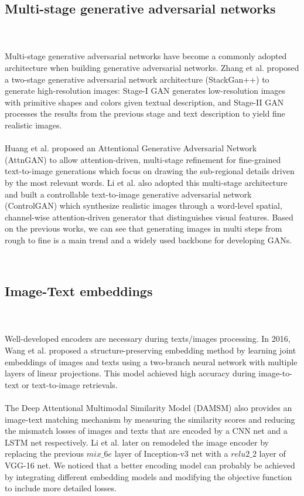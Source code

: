 \documentclass[10pt,twocolumn,letterpaper]{article}
\begin{document}
\subsection{Multi-stage generative adversarial networks}
\\\\
\noindent Multi-stage generative adversarial networks have become a commonly adopted architecture when building generative adversarial networks. Zhang et al. proposed a two-stage generative adversarial network architecture (StackGan++)  \cite{zhang2018stackgan++} to generate high-resolution images: Stage-I GAN generates low-resolution images with primitive shapes and colors given textual description, and Stage-II GAN processes the results from the previous stage and text description to yield fine realistic images.
\\\\
Huang et al. \cite{xu2018attngan} proposed an Attentional Generative Adversarial Network (AttnGAN) to allow attention-driven, multi-stage refinement for fine-grained text-to-image generations which focus on drawing the sub-regional details driven by the most relevant words. Li et al. \cite{li2019controllable} also adopted this multi-stage architecture and built a controllable text-to-image generative adversarial network (ControlGAN) which synthesize realistic images through a word-level spatial, channel-wise attention-driven generator that distinguishes visual features. Based on the previous works, we can see that generating images in multi steps from rough to fine is a main trend and a widely used backbone for developing GANs. 



\\
\subsection{Image-Text embeddings}
\\\\
\noindent Well-developed encoders are necessary during texts/images processing. In 2016, Wang et al. proposed a structure-preserving embedding method \cite{wang2016learning} by learning joint embeddings of images and texts using a two-branch neural network with multiple layers of linear projections. This model achieved high accuracy during image-to-text or text-to-image retrievals.
\\\\
The Deep Attentional Multimodal Similarity Model (DAMSM) \cite{xu2018attngan} also provides an image-text matching mechanism by measuring the similarity scores and reducing the mismatch losses of images and texts that are encoded by a CNN net and a LSTM net respectively. Li et al. \cite{li2019controllable} later on remodeled the image encoder by replacing the previous $mix\_6e$ layer of Inception-v3 net with a $relu2\_2$ layer of VGG-16 net. We noticed that a better encoding model can probably be achieved by integrating different embedding models and modifying the objective function to include more detailed losses.\\ 
\end{document}
